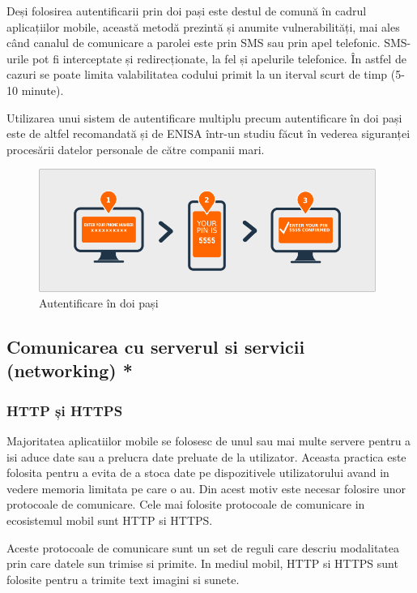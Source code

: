 \documentclass[12pt]{article}
\begin{document}
Deși folosirea autentificarii prin doi pași este destul de comună în cadrul aplicațiilor mobile, această metodă
prezintă și anumite vulnerabilități, mai ales când canalul de comunicare a parolei este prin SMS sau prin 
apel telefonic.
SMS-urile pot fi interceptate și redirecționate, la fel și apelurile telefonice. În astfel de cazuri
se poate limita valabilitatea codului primit la un iterval scurt de timp (5-10 minute). 

Utilizarea unui sistem de autentificare multiplu precum autentificare în doi pași este de altfel recomandată
și de ENISA \cite{enisa-security-data-processing} într-un studiu făcut în vederea 
siguranței procesării datelor personale de către companii mari.

\begin{figure}[H]
\centering
\includegraphics[height=4cm]{wordpress-two-factor-authentication.png}
\caption{Autentificare în doi pași}
\end{figure}

\subsection{Comunicarea cu serverul si servicii (networking) *}
\subsubsection{HTTP și HTTPS}

Majoritatea aplicatiilor mobile se folosesc de unul sau mai multe servere pentru a isi aduce date
sau a prelucra date preluate de la utilizator. Aceasta practica este folosita pentru a evita de a stoca
date pe dispozitivele utilizatorului avand in vedere memoria limitata pe care o au. Din acest motiv 
este necesar folosire unor protocoale de comunicare. Cele mai folosite protocoale de comunicare in ecosistemul
mobil sunt HTTP si HTTPS.

Aceste protocoale de comunicare sunt un set de reguli care descriu modalitatea prin care datele sun trimise si 
primite. In mediul mobil, HTTP si HTTPS sunt folosite pentru a trimite text imagini si sunete.
\end{document}
